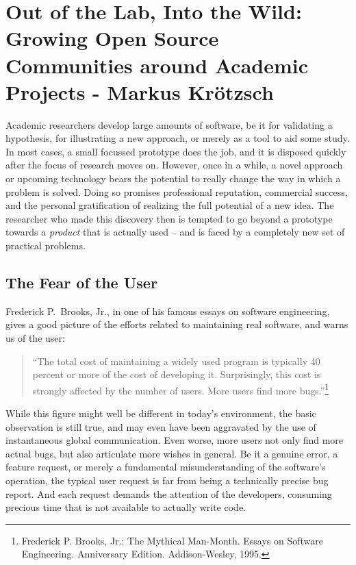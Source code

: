 \section{Out of the Lab, Into the Wild: Growing Open Source Communities around Academic Projects - Markus Kr\"{o}tzsch}
Academic researchers develop large amounts of software, be it for validating a hypothesis, for illustrating a new approach, or merely as a tool to aid some study. In most cases, a small focussed prototype does the job, and it is disposed quickly after the focus of research moves on. However, once in a while, a novel approach or upcoming technology bears the potential to really change the way in which a problem is solved. Doing so promises professional reputation, commercial success, and the personal gratification of realizing the full potential of a new idea. The researcher who made this discovery then is tempted to go beyond a prototype towards a \emph{product} that is actually used -- and is faced by a completely new set of practical problems.

\subsection*{The Fear of the User}

Frederick P.\ Brooks, Jr., in one of his famous essays on software engineering, gives a good picture of the efforts related to maintaining real software, and warns us of the user:
%
\begin{quote}
``The total cost of maintaining a widely used program is typically 40 percent or more of the cost of developing it. Surprisingly, this cost is strongly affected by the number of users. More users find more bugs.''\footnote{Frederick P. Brooks, Jr.: The Mythical Man-Month. Essays on Software Engineering. Anniversary Edition. Addison-Wesley, 1995.}
\end{quote}
%
While this figure might well be different in today's environment, the basic observation is still true, and may even have been aggravated by the use of instantaneous global communication. Even worse, more users not only find more actual bugs, but also articulate more wishes in general. Be it a genuine error, a feature request, or merely a fundamental misunderstanding of the software's operation, the typical user request is far from being a technically precise bug report. And each request demands the attention of the developers, consuming precious time that is not available to actually write code.

